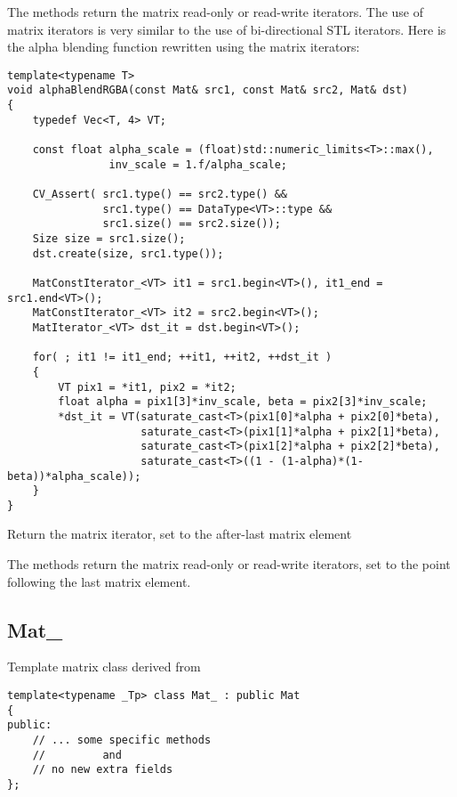 
The methods return the matrix read-only or read-write iterators. The use of matrix iterators is very similar to the use of bi-directional STL iterators. Here is the alpha blending function rewritten using the matrix iterators:

\begin{lstlisting}
template<typename T>
void alphaBlendRGBA(const Mat& src1, const Mat& src2, Mat& dst)
{
    typedef Vec<T, 4> VT;
    
    const float alpha_scale = (float)std::numeric_limits<T>::max(),
                inv_scale = 1.f/alpha_scale;
    
    CV_Assert( src1.type() == src2.type() &&
               src1.type() == DataType<VT>::type &&
               src1.size() == src2.size());
    Size size = src1.size();
    dst.create(size, src1.type());
    
    MatConstIterator_<VT> it1 = src1.begin<VT>(), it1_end = src1.end<VT>();
    MatConstIterator_<VT> it2 = src2.begin<VT>();
    MatIterator_<VT> dst_it = dst.begin<VT>();
    
    for( ; it1 != it1_end; ++it1, ++it2, ++dst_it )
    {
        VT pix1 = *it1, pix2 = *it2;
        float alpha = pix1[3]*inv_scale, beta = pix2[3]*inv_scale;
        *dst_it = VT(saturate_cast<T>(pix1[0]*alpha + pix2[0]*beta),
                     saturate_cast<T>(pix1[1]*alpha + pix2[1]*beta),
                     saturate_cast<T>(pix1[2]*alpha + pix2[2]*beta),
                     saturate_cast<T>((1 - (1-alpha)*(1-beta))*alpha_scale));
    }
}
\end{lstlisting}


Return the matrix iterator, set to the after-last matrix element


The methods return the matrix read-only or read-write iterators, set to the point following the last matrix element.


\subsection{Mat\_}\label{MatT}
Template matrix class derived from 

\begin{lstlisting}
template<typename _Tp> class Mat_ : public Mat
{
public:
    // ... some specific methods
    //         and
    // no new extra fields
};
\end{lstlisting}

